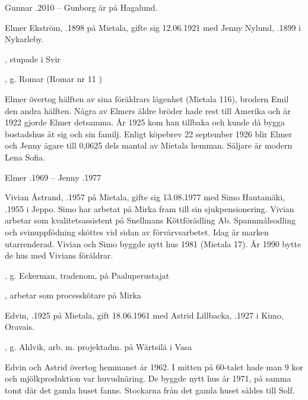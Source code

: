 Gunnar .2010  --  Gunborg är på Hagalund.


Elmer Ekström, .1898 på Mietala, gifte sig 12.06.1921 med Jenny Nylund, .1899 i Nykarleby.
\begin{jhchildren}
  \item {}, stupade i Svir
  \item {}
  \item {}, g. Romar (Romar nr 11 )
\end{jhchildren}
Elmer övertog hälften av sina föräldrars lägenhet (Mietala 116), brodern Emil den andra hälften. Några av Elmers äldre bröder hade rest till  Amerika och år 1922 gjorde Elmer detsamma. År 1925 kom han tillbaka och kunde då bygga bostadshus åt sig och sin familj. Enligt köpebrev 22 september 1926 blir Elmer och Jenny ägare till 0,0625 dels mantal av Mietala hemman. Säljare är modern Lena Sofia.

Elmer .1969  --  Jenny .1977




Vivian Åstrand, .1957 på Mietala, gifte sig 13.08.1977 med Simo Hautamäki, .1955 i Jeppo. Simo har arbetat på Mirka fram till sin sjukpensionering. Vivian arbetar som kvalitetsassistent på Snellmans Köttförädling Ab. Spannmålsodling och  svinuppfödning sköttes vid sidan av förvärvsarbetet. Idag är marken utarrenderad.
Vivian och Simo byggde nytt hus 1981 (Mietala 17). År 1990 bytte de hus med Vivians föräldrar.
\begin{jhchildren}
  \item {}, g. Eckerman, tradenom, på Paaluperustajat
  \item {}, arbetar som processkötare på Mirka
\end{jhchildren}



Edvin, .1925 på Mietala, gift  18.06.1961 med Astrid Lillbacka, .1927 i Kimo, Oravais.
\begin{jhchildren}
  \item {}
  \item {}, g. Ahlvik, arb. m. projektadm. på Wärtsilä i Vasa
\end{jhchildren}
Edvin och Astrid övertog hemmanet år 1962. I mitten på 60-talet hade man 9 kor och mjölkproduktion var huvudnäring. De  byggde nytt hus år 1971, på samma tomt där det gamla huset fanns. Stockarna från det gamla huset såldes till Solf.

